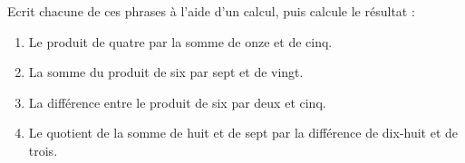 \documentclass[a4paper,11pt]{article}
\begin{document}
\begin{question}[(2 points)]
	Ecrit chacune de ces phrases à l’aide d’un calcul, puis calcule le résultat :
	\begin{enumerate}
		\item Le produit de quatre par la somme de onze et de cinq. \vspace{3em}
		\item La somme du produit de six par sept et de vingt. \vspace{3em}
		\item La différence entre le produit de six par deux et cinq. \vspace{3em}
		\item Le quotient de la somme de huit et de sept par la différence de dix-huit et de trois.
	\end{enumerate}
\end{question}
\end{document}
